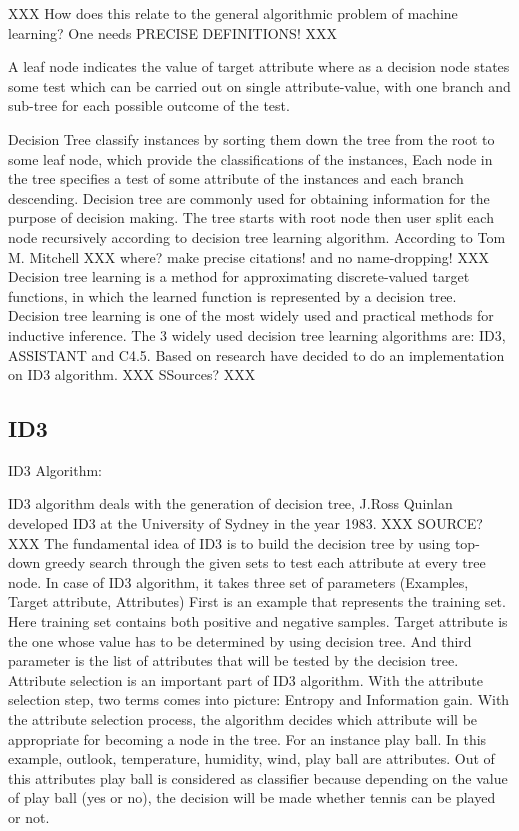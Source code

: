 \documentclass{article}
\begin{document}
XXX How does this relate to the general algorithmic problem of machine learning? One needs PRECISE DEFINITIONS! XXX

A leaf node indicates the value of target attribute where as a decision node states some test which can be carried out on single attribute-value, with one branch and sub-tree for each possible outcome of the test.

Decision Tree classify instances by sorting them down the tree from the root to some leaf node, which provide the classifications of the instances, Each node in the tree specifies a test of some attribute of the instances and each branch descending.
Decision tree are commonly used for obtaining information for the purpose of decision making. The tree starts with root node then user split each node recursively according to decision tree learning algorithm.
According to Tom M. Mitchell XXX where? make precise citations! and no name-dropping! XXX Decision tree learning is a method for approximating discrete-valued target functions, in which the learned function is represented by a decision tree. Decision tree learning is one of the most widely used and practical methods for inductive inference. The 3 widely used decision tree learning algorithms are: ID3, ASSISTANT and C4.5. Based on research have decided to do an implementation on ID3 algorithm. XXX SSources? XXX


\subsection{ID3}
\label{sec:ID3}

ID3 Algorithm:

ID3 algorithm deals with the generation of decision tree, J.Ross Quinlan developed ID3 at the University of Sydney in the year 1983. XXX SOURCE? XXX The fundamental idea of ID3 is to build the decision tree by using top-down greedy search through the given sets to test each attribute at every tree node.
In case of ID3 algorithm, it takes three set of parameters
(Examples, Target attribute, Attributes)
First is an example that represents the training set. Here training set contains both positive and negative samples. Target attribute is the one whose value has to be determined by using decision tree. And third parameter is the list of attributes that will be tested by the decision tree. Attribute selection is an important part of ID3 algorithm. With the attribute selection step, two terms comes into picture: Entropy and Information gain. With the attribute selection process, the algorithm decides which attribute will be appropriate for becoming a node in the tree.
For an instance play ball. In this example, outlook, temperature, humidity, wind, play ball are attributes. Out of this attributes play ball is considered as classifier because depending on the value of play ball (yes or no), the decision will be made whether tennis can be played or not.
\end{document}
